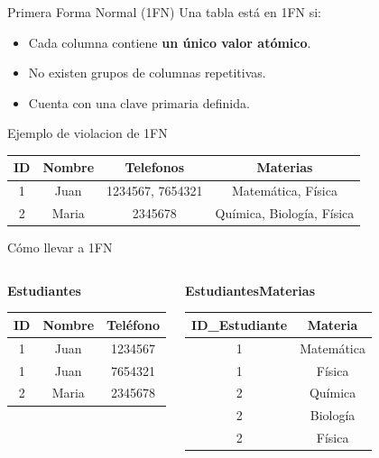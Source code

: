 \documentclass{beamer}
\begin{document}
\begin{frame}{Primera Forma Normal (1FN)}
    Una tabla está en 1FN si:
    \begin{itemize}
        \item Cada columna contiene \textbf{un único valor atómico}.
        \item No existen grupos de columnas repetitivas.
        \item Cuenta con una clave primaria definida.
    \end{itemize}
\end{frame}

\begin{frame}{Ejemplo de violacion de 1FN}
    \small
    \begin{center}
    \begin{tabular}{cccc}
        \hline
        ID & Nombre & Telefonos & Materias \\
        \hline
        1 & Juan & 1234567, 7654321 & Matemática, Física \\
        2 & Maria & 2345678 & Química, Biología, Física \\
        \hline
    \end{tabular}
    \end{center}
\end{frame}

\begin{frame}{Cómo llevar a 1FN}
    \small
    \begin{columns}
            \begin{center}
            \textbf{Estudiantes}\\[0.1cm]
            \begin{tabular}{ccc}
                \hline
                ID & Nombre & Teléfono \\
                \hline
                1 & Juan & 1234567 \\
                1 & Juan & 7654321 \\
                2 & Maria & 2345678 \\
                \hline
            \end{tabular}
            \end{center}
            \begin{center}
            \textbf{EstudiantesMaterias}\\[0.1cm]
            \begin{tabular}{cc}
                \hline
                ID\_Estudiante & Materia \\
                \hline
                1 & Matemática \\
                1 & Física \\
                2 & Química \\
                2 & Biología \\
                2 & Física \\
                \hline
            \end{tabular}
            \end{center}
    \end{columns}
\end{frame}
\end{document}
